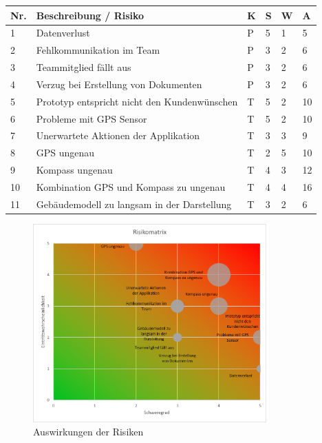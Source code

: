 \documentclass[a4paper]{scrreprt}
\begin{document}
\vspace{1em}
\noindent
\begin{tabularx}{\textwidth}{|l|X|l|l|l||l|}
	\hline
	\textbf{Nr.} & \textbf{Beschreibung / Risiko} & \textbf{K} & \textbf{S} & \textbf{W} & \textbf{A} \\
	\hline
	1 & Datenverlust & P & 5 & 1 & 5\\
	\hline
	2 & Fehlkommunikation im Team & P & 3 & 2 & 6 \\
	\hline
	3 & Teammitglied fällt aus & P & 3 & 2 & 6 \\
	\hline
	4 & Verzug bei Erstellung von Dokumenten & P & 3 & 2 & 6 \\
	\hline
	5 & Prototyp entspricht nicht den Kundenwünschen & T & 5 & 2 & 10 \\
	\hline
	6 & Probleme mit GPS Sensor & T & 5 & 2 & 10 \\
	\hline
	7 & Unerwartete Aktionen der Applikation & T & 3 & 3 & 9\\
	\hline
	8 & GPS ungenau & T & 2 & 5 & 10\\
	\hline
	9 & Kompass ungenau & T & 4 & 3 & 12\\
	\hline
	10 & Kombination GPS und Kompass zu ungenau & T & 4 & 4 & 16\\
	\hline
	11 & Gebäudemodell zu langsam in der Darstellung & T & 3 & 2 & 6\\
	\hline
\end{tabularx}

\vspace{1em}

\begin{figure}[h!]
	\centering
	\includegraphics[keepaspectratio, width=0.8\textwidth]{RisikoMatrix}
	\caption{Auswirkungen der Risiken}
\end{figure}
\end{document}
